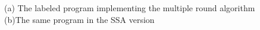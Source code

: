 \begin{example}
{\begin{figure}
\begin{subfigure}{0.4\textwidth}
    \end{subfigure}
    \vspace{-0.3cm}
    \caption{(a) The labeled program implementing the multiple round algorithm (b)The same program in the SSA version}
    \vspace{-0.5cm}
    \label{fig:multi_code}
    \end{figure}
}
%
%
%
%
%
\end{example}
